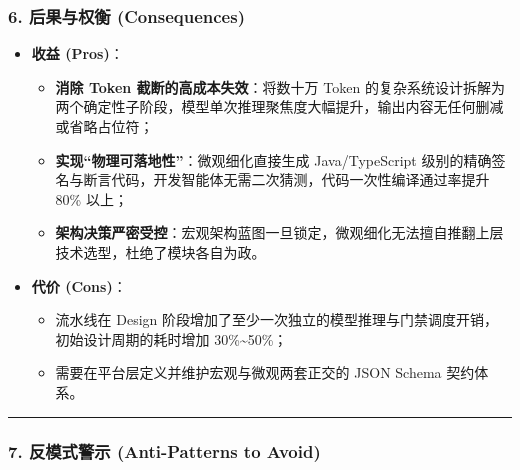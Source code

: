 \documentclass[
]{ctexart}
\providecommand{\tightlist}{%
  \setlength{\itemsep}{0pt}\setlength{\parskip}{0pt}}
\renewcommand{\_}{\discretionary{}{}{\textunderscore}}
\begin{document}
\subsubsection{6. 后果与权衡
(Consequences)}\label{ux540eux679cux4e0eux6743ux8861-consequences-4}

\begin{itemize}
\tightlist
\item
  \textbf{收益 (Pros)}：

  \begin{itemize}
  \tightlist
  \item
    \textbf{消除 Token 截断的高成本失效}：将数十万 Token
    的复杂系统设计拆解为两个确定性子阶段，模型单次推理聚焦度大幅提升，输出内容无任何删减或省略占位符；
  \item
    \textbf{实现``物理可落地性''}：微观细化直接生成 Java/TypeScript
    级别的精确签名与断言代码，开发智能体无需二次猜测，代码一次性编译通过率提升
    80\% 以上；
  \item
    \textbf{架构决策严密受控}：宏观架构蓝图一旦锁定，微观细化无法擅自推翻上层技术选型，杜绝了模块各自为政。
  \end{itemize}
\item
  \textbf{代价 (Cons)}：

  \begin{itemize}
  \tightlist
  \item
    流水线在 Design
    阶段增加了至少一次独立的模型推理与门禁调度开销，初始设计周期的耗时增加
    30\%\textasciitilde50\%；
  \item
    需要在平台层定义并维护宏观与微观两套正交的 JSON Schema 契约体系。
  \end{itemize}
\end{itemize}

\begin{center}\rule{0.5\linewidth}{0.5pt}\end{center}

\subsubsection{7. 反模式警示 (Anti-Patterns to
Avoid)}\label{ux53cdux6a21ux5f0fux8b66ux793a-anti-patterns-to-avoid-4}
\end{document}
